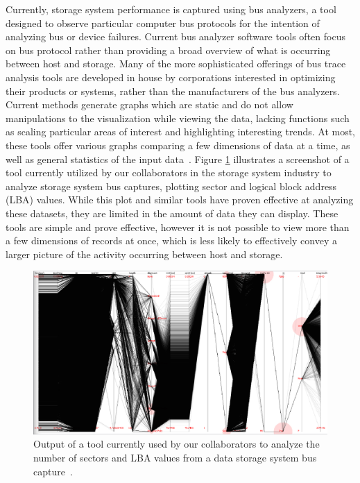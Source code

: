 \documentclass[journal]{vgtc}                %
\begin{document}
Currently, storage system performance is captured using bus analyzers, a tool designed to observe particular computer bus protocols for the intention of analyzing bus or device failures. Current bus analyzer software tools often focus on bus protocol rather than providing a broad overview of what is occurring between host and storage. Many of the more sophisticated offerings of bus trace analysis tools are developed in house by corporations interested in optimizing their products or systems, rather than the manufacturers of the bus analyzers. Current methods generate graphs which are static and do not allow manipulations to the visualization while viewing the data, lacking functions such as scaling particular areas of interest and highlighting interesting trends. At most, these tools offer various graphs comparing a few dimensions of data at a time, as well as general statistics of the input data~\cite{internal:understanding}. Figure \ref{fig:prev_tool2} illustrates a screenshot of a tool currently utilized by our collaborators in the storage system industry to analyze storage system bus captures, plotting sector and logical block address (LBA) values. While this plot and similar tools have proven effective at analyzing these datasets, they are limited in the amount of data they can display. These tools are simple and prove effective, however it is not possible to view more than a few dimensions of records at once, which is less likely to effectively convey a larger picture of the activity occurring between host and storage.

\begin{figure}[h!]
 \centering
 \includegraphics[width=0.9\columnwidth]{images/prev_tool2.eps}
 \caption[Output of a tool currently used to analyze workload datasets.]{Output of a tool currently used by our collaborators to analyze the number of sectors and LBA values from a data storage system bus capture~\cite{internal:collab}.}
 \label{fig:prev_tool2}
\end{figure}
\end{document}
